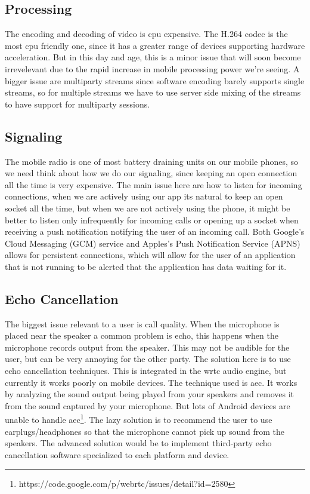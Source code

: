 \subsection{Processing}
The encoding and decoding of video is \gls{cpu} expensive. The H.264 codec is the most \gls{cpu} friendly one, since it has a greater range of devices supporting hardware acceleration. But in this day and age, this is a minor issue that will soon become irrevelevant due to the rapid increase in mobile processing power we're seeing. A bigger issue are multiparty streams since software encoding barely supports single streams, so for multiple streams we have to use server side mixing of the streams to have support for multiparty sessions.


\subsection{Signaling}
The mobile radio is one of most battery draining units on our mobile phones, so we need think about how we do our signaling, since keeping an open connection all the time is very expensive. The main issue here are how to listen for incoming connections, when we are actively using our app its natural to keep an open socket all the time, but when we are not actively using the phone, it might be better to listen only infrequently for incoming calls or opening up a socket when receiving a push notification notifying the user of an incoming call. Both Google's Cloud Messaging (GCM) service and Apples's Push Notification Service (APNS) allows for persistent connections, which will allow for the user of an application that is not running to be alerted that the application has data waiting for it.


\subsection{Echo Cancellation}
The biggest issue relevant to a user is call quality. When the microphone is placed near the speaker a common problem is echo, this happens when the microphone records output from the speaker. This may not be audible for the user, but can be very annoying for the other party. The solution here is to use echo cancellation techniques. This is integrated in the \gls{wrtc} audio engine, but currently it works poorly on mobile devices. The technique used is \gls{aec}. It works by analyzing the sound output being played from your speakers and removes it from the sound captured by your microphone. But lots of Android devices are unable to handle \gls{aec}\footnote{https://code.google.com/p/webrtc/issues/detail?id=2580}. The lazy solution is to recommend the user to use earplugs/headphones so that the microphone cannot pick up sound from the speakers. The advanced solution would be to implement third-party echo cancellation software specialized to each platform and device.


